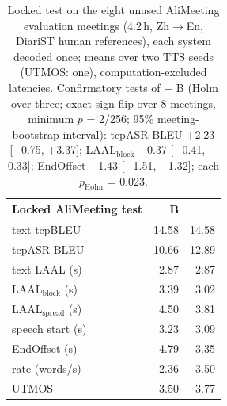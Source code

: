 \begin{table}[!htbp]
\centering\small
\setlength{\tabcolsep}{6pt}
\begin{tabular}{lrr}
\toprule
Locked AliMeeting test & B & \sys{} \\
\midrule
text tcpBLEU & 14.58 & 14.58 \\
tcpASR-BLEU & 10.66 & 12.89 \\
text LAAL (s) & 2.87 & 2.87 \\
LAAL$_\text{block}$ (s) & 3.39 & 3.02 \\
LAAL$_\text{spread}$ (s) & 4.50 & 3.81 \\
speech start (s) & 3.23 & 3.09 \\
EndOffset (s) & 4.79 & 3.35 \\
rate (words/s) & 2.36 & 3.50 \\
UTMOS & 3.50 & 3.77 \\
\bottomrule
\end{tabular}
\caption{Locked test on the eight unused AliMeeting evaluation meetings (4.2\,h, Zh$\rightarrow$En, DiariST human references), each system decoded once; means over two TTS seeds (UTMOS: one), computation-excluded latencies. Confirmatory tests of \sys{} $-$ B (Holm over three; exact sign-flip over 8 meetings, minimum $p$ = 2/256; 95\% meeting-bootstrap interval): tcpASR-BLEU +2.23 [+0.75, +3.37]; LAAL$_\text{block}$ $-$0.37 [$-$0.41, $-$0.33]; EndOffset $-$1.43 [$-$1.51, $-$1.32]; each $p_\text{Holm}$ = 0.023.}
\label{tab:alieval}
\end{table}
